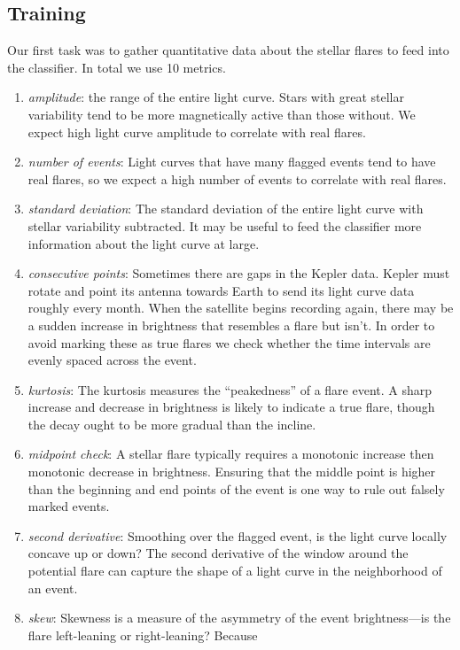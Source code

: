 \documentclass[11pt]{article}
\begin{document}
\subsection{Training}
\label{sec:train}
Our first task was to gather quantitative data about the stellar
flares to feed into the classifier.  In total we use 10 metrics.
\begin{enumerate}[(1)]
\item \emph{amplitude}: the range of the entire light curve.  Stars
  with great stellar variability tend to be more magnetically active
  than those without.  We expect high light curve amplitude to
  correlate with real flares.
\item \emph{number of events}: Light curves that have many flagged
  events tend to have real flares, so we expect a high number of
  events to correlate with real flares.
\item \emph{standard deviation}: The standard deviation of the entire
  light curve with stellar variability subtracted.  It may be useful
  to feed the classifier more information about the light curve at
  large.
\item \emph{consecutive points}: Sometimes there are gaps in the
  Kepler data.  Kepler must rotate and point its antenna towards Earth
  to send its light curve data roughly every month.  When the
  satellite begins recording again, there may be a sudden increase in
  brightness that resembles a flare but isn't.  In order to avoid
  marking these as true flares we check whether the time intervals are
  evenly spaced across the event.
\item \emph{kurtosis}: The kurtosis measures the ``peakedness'' of a
  flare event.  A sharp increase and decrease in brightness is likely
  to indicate a true flare, though the decay ought to be more gradual
  than the incline.
\item \emph{midpoint check}: A stellar flare typically requires a
  monotonic increase then monotonic decrease in brightness.  Ensuring
  that the middle point is higher than the beginning and end points of
  the event is one way to rule out falsely marked events.
\item \emph{second derivative}: Smoothing over the flagged event, is
  the light curve locally concave up or down?  The second derivative
  of the window around the potential flare can capture the shape of a
  light curve in the neighborhood of an event.
\item \emph{skew}: Skewness is a measure of the asymmetry of the event
  brightness---is the flare left-leaning or right-leaning?  Because

\end{enumerate}
\end{document}
